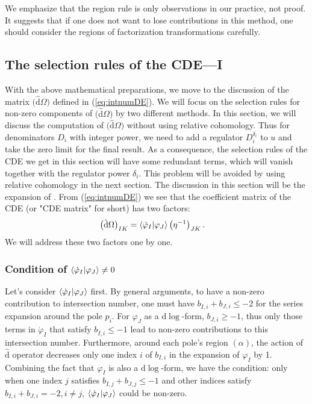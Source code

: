 \documentclass[a4paper,11pt]{article}
\newcommand{\nd}{\mathrm{d}}
\newcommand{\nds}{\hat{\mathrm{d}}}
\def\eref#1{(\ref{#1})}
\begin{document}
We emphasize that the region rule is only observations in our practice, not proof. It suggests that if one does not want to lose contributions in this method, one should consider the regions of factorization transformations carefully.






\subsection{The selection rules of the CDE---I}



With the above mathematical preparations, we move to the discussion of the matrix  $\big( \nds \Omega \big)$ 
defined in \eref{eq:intnumDE}. We will focus on the selection rules for non-zero components of $\big( \nds \Omega \big)$ by two different methods. In this section, we will discuss the computation 
of $\big( \nds \Omega \big)$ without using relative cohomology. Thus for denominators $D_i$ with integer power, we need to add a regulator  $D_i^{\delta_i}$ to $u$ and take the zero limit for the final result. As a consequence,  the selection rules of the CDE we get in this section will have some redundant terms, which will vanish together with the regulator power $\delta_i$. This problem will be avoided by using relative cohomology in the next
section. The discussion in this section will be the expansion of \cite{Chen:2023kgw}.
From \eref{eq:intnumDE} we see that the coefficient matrix of the CDE (or "CDE matrix" for short)  has two factors:
\begin{align}
	&\big( \nds \Omega \big)_{IK} = \braket{\dot{\varphi}_I|\varphi_J} \big( \eta^{-1} \big)_{JK} \, .
	\label{eq:intnumDE-1}
\end{align}
We will address these two factors one by one.

\subsubsection{Condition of $\braket{\dot{\varphi}_I|\varphi_J}\neq 0$}

Let's consider $\braket{\dot{\varphi}_I|\varphi_J}$ first. By general arguments, to have a non-zero contribution
to intersection number, one must have $b_{\dot{I},i}+b_{J,i} \leq -2$ for the series expansion around the pole $p_i$.
For $\varphi_J$ as a $\nd \log$-form, $b_{J,i}\geq -1$, thus only those terms in $\dot{\varphi}_I$ that satisfy $b_{\dot{I},i}\leq -1$ lead to non-zero contributions to this intersection number. Furthermore, around
each pole's region $(\alpha)$, the action of $\nds$ operator  decreases only one index $i$ of $b_{I,i}$
in the expansion of $\varphi_I$  by 1. Combining the fact that $\varphi_I$ is also a $\nd \log$-form, we have 
the condition: only when one index $j$ satisfies $b_{I,j}+b_{J,j}\leq -1$  and other indices satisfy  $b_{I,i}+b_{J,i} = -2, i\neq j$, $\braket{\dot{\varphi}_I|\varphi_J}$ could be non-zero.
\end{document}
